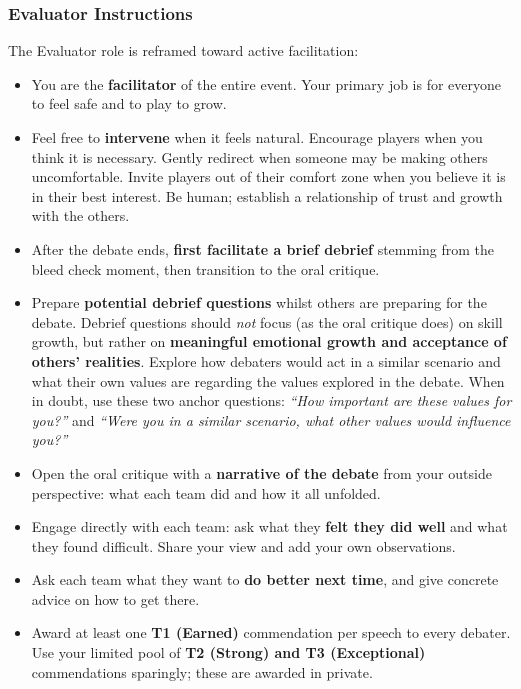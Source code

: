 \subsubsection{Evaluator Instructions}

The Evaluator role is reframed toward active facilitation:

\begin{itemize}
    \item You are the \textbf{facilitator} of the entire event. Your primary job is for everyone to feel safe and to play to grow.
    \item Feel free to \textbf{intervene} when it feels natural. Encourage players when you think it is necessary. Gently redirect when someone may be making others uncomfortable. Invite players out of their comfort zone when you believe it is in their best interest. Be human; establish a relationship of trust and growth with the others.
    \item After the debate ends, \textbf{first facilitate a brief debrief} stemming from the bleed check moment, then transition to the oral critique.
    \item Prepare \textbf{potential debrief questions} whilst others are preparing for the debate. Debrief questions should \textit{not} focus (as the oral critique does) on skill growth, but rather on \textbf{meaningful emotional growth and acceptance of others' realities}. Explore how debaters would act in a similar scenario and what their own values are regarding the values explored in the debate. When in doubt, use these two anchor questions: \textit{``How important are these values for you?''} and \textit{``Were you in a similar scenario, what other values would influence you?''}
    \item Open the oral critique with a \textbf{narrative of the debate} from your outside perspective: what each team did and how it all unfolded.
    \item Engage directly with each team: ask what they \textbf{felt they did well} and what they found difficult. Share your view and add your own observations.
    \item Ask each team what they want to \textbf{do better next time}, and give concrete advice on how to get there.
    \item Award at least one \textbf{T1 (Earned)} commendation per speech to every debater. Use your limited pool of \textbf{T2 (Strong) and T3 (Exceptional)} commendations sparingly; these are awarded in private.
\end{itemize}

\newpage
